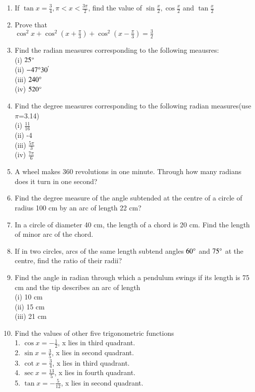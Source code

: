\begin{enumerate}[label=\arabic*]
\item If $\tan x=\frac{3}{4}, \pi<x<\frac{3\pi}{2}$, find the value of $\sin\frac{x}{2},\cos\frac{x}{2}$ and $\tan\frac{x}{2}$\\


\item Prove that\\
$\cos^{2}x+\cos^{2}(x+\frac{\pi}{3})+\cos^{2}(x-\frac{\pi}{3})=\frac{3}{2}$\\
%
\item Find the radian measures corresponding to the following meausres:\\
(i) $25\degree $\\
(ii) $-47\degree 30^{'}$\\
(iii) $240\degree$\\
(iv) $520\degree$

\item Find the degree measures corresponding to the following radian measures(use $\pi$=3.14)\\
(i) $\frac{11}{16}$\\
(ii) -4\\
(iii) $\frac{5\pi}{3}$\\
(iv) $\frac{7\pi}{6}$\\

\item A wheel makes 360 revolutions in one minute. Through how many radians does it turn in one second?

\item Find the degree measure of the angle subtended at the centre of a circle of radius 100 cm by an arc of length 22 cm?

\item In a circle of diameter 40 cm, the length of a chord is 20 cm. Find the length of minor arc of the chord.

\item If in two circles, arcs of the same length subtend angles $60\degree$ and $75\degree$ at the centre, find the ratio of their radii?

\item Find the angle in radian through which a pendulum swings if its length is 75 cm and the tip describes an arc of length\\
(i) 10 cm\\
(ii) 15 cm\\
(iii) 21 cm

\item Find the values of other five trigonometric functions\\ 
1. $\cos x=-\frac{1}{2}$, x lies in third quadrant.\\
2. $\sin x= \frac{3}{5}$, x lies in second quadrant.\\
3. $\cot x= \frac{3}{4}$, x lies in third quadrant.\\
4. $\sec x= \frac{13}{5}$, x lies in fourth quadrant.\\
5. $\tan x=-\frac{5}{12}$, x lies in second quadrant.


\end{enumerate}
